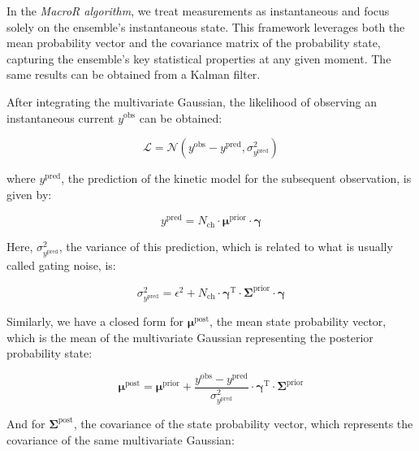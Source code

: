 \documentclass[pdflatex,sn-mathphys-num]{sn-jnl}%
\theoremstyle{thmstyleone}%
\theoremstyle{thmstyletwo}%
\theoremstyle{thmstylethree}%
\begin{document}
In the \textit{MacroR algorithm}, we treat measurements as instantaneous and focus solely on the ensemble's instantaneous state. This framework leverages both the mean probability vector and the covariance matrix of the probability state, capturing the ensemble's key statistical properties at any given moment. The same results can be obtained from a Kalman filter. 

After integrating the multivariate Gaussian, the likelihood of observing an instantaneous current \( y^{\text{obs}} \) can be obtained:

\begin{equation}
	\mathcal{L} = \mathcal{N} \left( y^{\text{obs}} - y^{\text{pred}}, \sigma^2_{y^{\text{pred}}} \right)
	\label{eq:macro_likelihood}
\end{equation}

where \( y^{\text{pred}} \), the prediction of the kinetic model for the subsequent observation, is given by:

\begin{equation}
	y^{\text{pred}} = N_{\text{ch}} \cdot \boldsymbol{\mu}^{\text{prior}} \cdot \boldsymbol{\gamma}
	\label{eq:macro_predicted_y}
\end{equation}

Here, \( \sigma^2_{y^{\text{pred}}} \), the variance of this prediction, which is related to what is usually called gating noise, is:

\begin{equation}
	\sigma^2_{y^{\text{pred}}} = \epsilon^2 + N_{\text{ch}} \cdot \boldsymbol{\gamma}^{\mathrm{T}} \cdot \boldsymbol{\Sigma}^{\text{prior}} \cdot \boldsymbol{\gamma}
	\label{eq:macro_sigma_pred}
\end{equation}

Similarly, we have a closed form for \( \boldsymbol{\mu}^{\text{post}} \), the mean state probability vector, which is the mean of the multivariate Gaussian representing the posterior probability state:

\begin{equation}
	\boldsymbol{\mu}^{\text{post}} = \boldsymbol{\mu}^{\text{prior}} + \frac{y^{\text{obs}} - y^{\text{pred}}}{\sigma^2_{y^{\text{pred}}}} \cdot \boldsymbol{\gamma}^{\mathrm{T}} \cdot \boldsymbol{\Sigma}^{\text{prior}}
	\label{eq:macro_mean_posterior}
\end{equation}

And for \( \boldsymbol{\Sigma}^{\text{post}} \), the covariance of the state probability vector, which represents the covariance of the same multivariate Gaussian:
\end{document}
